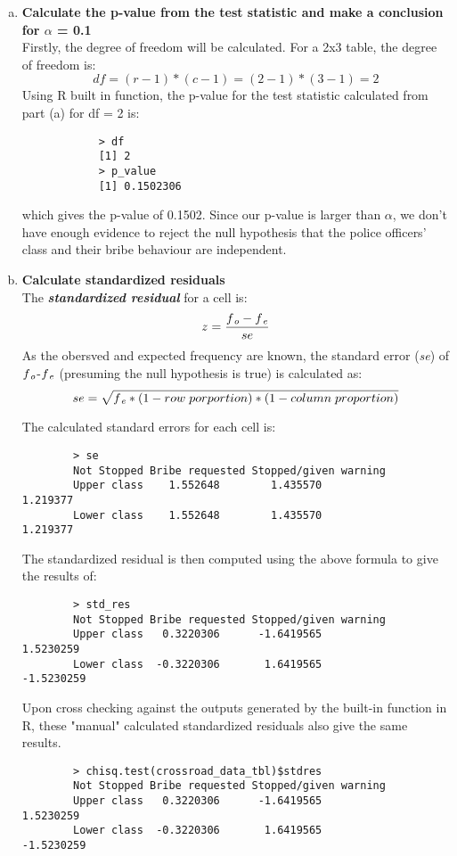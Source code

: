 \documentclass[12pt,letterpaper]{article}
\begin{document}
\begin{enumerate} [(a)]
	\item \textbf{Calculate the p-value from the test statistic and make a conclusion for $\alpha$ = 0.1} \\
	Firstly, the degree of freedom will be calculated. For a 2x3 table, the degree of freedom is:
		$$ df = (r - 1)*(c - 1) = (2 - 1)*(3 - 1) = 2$$
	Using R built in function, the p-value for the test statistic calculated from part (a) for df = 2 is:
		
		\begin{verbatim}
			> df
			[1] 2
			> p_value
			[1] 0.1502306
		\end{verbatim}
	which gives the p-value of 0.1502. Since our p-value is larger than $\alpha$, we don't have enough evidence to reject the null hypothesis that the police officers' class and their bribe behaviour are independent.
	
	\item \textbf{Calculate standardized residuals} \\
	The \textbf{\textit{standardized residual}} for a cell is:
		$$ z = \frac{f\textsubscript{\textit{o}} - f\textsubscript{\textit{e}}}{se}$$
	As the obersved and expected frequency are known, the standard error (\textit{se}) of $f\textsubscript{\textit{o}}$-$f\textsubscript{\textit{e}}$ (presuming the null hypothesis is true) is calculated as:
		$$ se = \sqrt{f\textsubscript{\textit{e}}*(1 - row \; porportion)*(1 - column \; proportion)}$$
		
	The calculated standard errors for each cell is:
	\begin{verbatim}
		> se
		Not Stopped Bribe requested Stopped/given warning
		Upper class    1.552648        1.435570              1.219377
		Lower class    1.552648        1.435570              1.219377
	\end{verbatim}
	The standardized residual is then computed using the above formula to give the results of:
		
	\begin{verbatim}
		> std_res
		Not Stopped Bribe requested Stopped/given warning
		Upper class   0.3220306      -1.6419565             1.5230259
		Lower class  -0.3220306       1.6419565            -1.5230259
	\end{verbatim}
	Upon cross checking against the outputs generated by the built-in function in R, these "manual" calculated standardized residuals also give the same results.
		
	\begin{verbatim}
		> chisq.test(crossroad_data_tbl)$stdres
		Not Stopped Bribe requested Stopped/given warning
		Upper class   0.3220306      -1.6419565             1.5230259
		Lower class  -0.3220306       1.6419565            -1.5230259
	\end{verbatim}


\end{enumerate}
\end{document}
